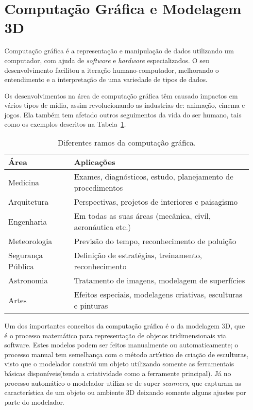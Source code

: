 \section{Computação Gráfica e Modelagem 3D}
	Computação gráfica é a representação e manipulação de dados utilizando um computador, com ajuda de \textit{software} e \textit{hardware} especializados. O seu desenvolvimento facilitou a iteração humano-computador, melhorando o entendimento e a interpretação de uma variedade de tipos de dados\cite{comp_grafica_h}.

	Os desenvolvimentos na área de computação gráfica têm causado impactos em vários tipos de mídia, assim revolucionando as industrias de: animação, cinema e jogos. Ela também tem afetado outros seguimentos da vida do ser humano, tais como os exemplos descritos na Tabela~\ref{tab:comp_teoria}. 

\begin{table}
\centering
\caption{Diferentes ramos da computação gráfica.}
\begin{tabular}{|l|l|}
	\hline
	Área & Aplicações \\ \hline
	Medicina &  Exames, diagnósticos, estudo, planejamento de procedimentos\\ \hline
	Arquitetura & Perspectivas, projetos de interiores e paisagismo\\ \hline
	Engenharia & Em todas as suas áreas (mecânica, civil, aeronáutica etc.)\\ \hline
	Meteorologia & Previsão do tempo, reconhecimento de poluição\\ \hline
	Segurança Pública & Definição de estratégias, treinamento, reconhecimento\\ \hline
	Astronomia & Tratamento de imagens, modelagem de superfícies\\ \hline
	Artes & Efeitos especiais, modelagens criativas, esculturas e pinturas\\
	\hline
\end{tabular}
\label{tab:comp_teoria}
\end{table}

	Um dos importantes conceitos da computação gráfica é o da modelagem 3D, que é o processo matemático para representação de objetos tridimensionais via software. Estes modelos podem ser feitos manualmente ou automaticamente; o processo manual tem semelhança com o método artístico de criação de esculturas, visto que o modelador constrói um objeto utilizando somente as ferramentais básicas disponíveis(tendo a criatividade como a ferramente principal). Já no processo automático o modelador utiliza-se de super \textit{scanners}, que capturam as característica de um objeto ou ambiente 3D deixando somente alguns ajustes por parte do modelador. 

